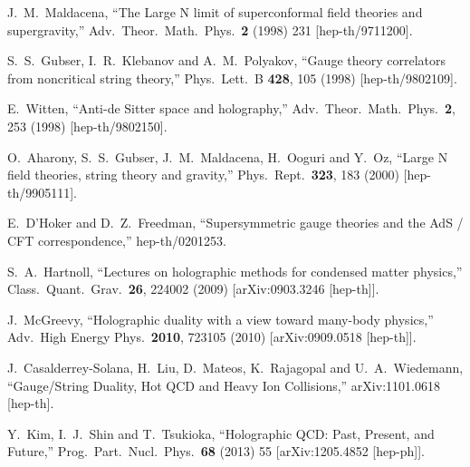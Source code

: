 \documentclass[12pt,notitlepage]{article}
\begin{document}
\begin{thebibliography}{99.}%
%
%
  J.~M.~Maldacena,
  ``The Large N limit of superconformal field theories and supergravity,''
  Adv.\ Theor.\ Math.\ Phys.\  {\bf 2} (1998) 231
  [hep-th/9711200].
 
 
  S.~S.~Gubser, I.~R.~Klebanov and A.~M.~Polyakov,
  ``Gauge theory correlators from noncritical string theory,''
  Phys.\ Lett.\ B {\bf 428}, 105 (1998)
  [hep-th/9802109].
 
  E.~Witten,
  ``Anti-de Sitter space and holography,''
  Adv.\ Theor.\ Math.\ Phys.\  {\bf 2}, 253 (1998)
  [hep-th/9802150].
 
  O.~Aharony, S.~S.~Gubser, J.~M.~Maldacena, H.~Ooguri and Y.~Oz,
  ``Large N field theories, string theory and gravity,''
  Phys.\ Rept.\  {\bf 323}, 183 (2000)
  [hep-th/9905111].
  
  E.~D'Hoker and D.~Z.~Freedman,
  ``Supersymmetric gauge theories and the AdS / CFT correspondence,''
  hep-th/0201253.
  
  S.~A.~Hartnoll,
  ``Lectures on holographic methods for condensed matter physics,''
  Class.\ Quant.\ Grav.\  {\bf 26}, 224002 (2009)
  [arXiv:0903.3246 [hep-th]].
 
 
  J.~McGreevy,
  ``Holographic duality with a view toward many-body physics,''
  Adv.\ High Energy Phys.\  {\bf 2010}, 723105 (2010)
  [arXiv:0909.0518 [hep-th]].
 
 
  J.~Casalderrey-Solana, H.~Liu, D.~Mateos, K.~Rajagopal and U.~A.~Wiedemann,
  ``Gauge/String Duality, Hot QCD and Heavy Ion Collisions,''
  arXiv:1101.0618 [hep-th].
  
  Y.~Kim, I.~J.~Shin and T.~Tsukioka,
  ``Holographic QCD: Past, Present, and Future,''
  Prog.\ Part.\ Nucl.\ Phys.\  {\bf 68} (2013) 55
  [arXiv:1205.4852 [hep-ph]].
 

\end{thebibliography}
\end{document}

